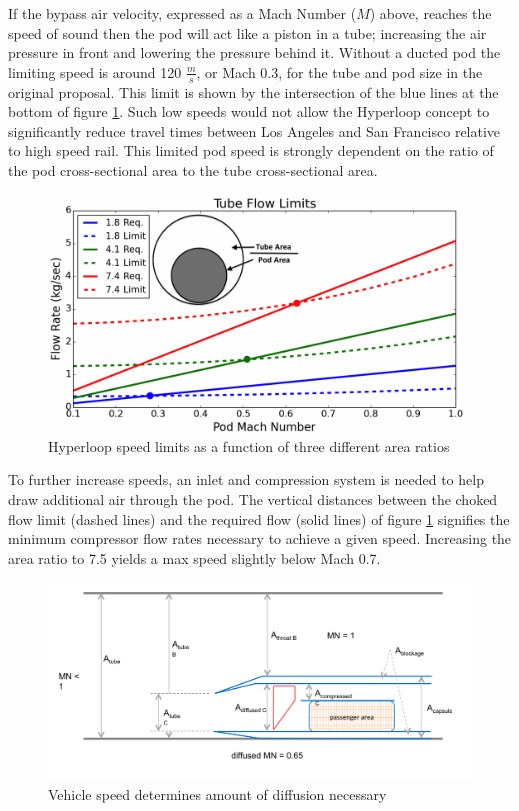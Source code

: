 \documentclass[heading.tex]{subfiles}
\begin{document}
If the bypass air velocity, expressed as a Mach Number ($M$) above, reaches the speed of sound then the pod will act like a piston in a tube;
increasing the air pressure in front and lowering the pressure behind it. Without a ducted pod the limiting speed is around
120 $\frac{m}{s}$, or Mach 0.3, for the tube and pod size in the original proposal. This limit is shown by the intersection of the blue lines at the
bottom of figure \ref{f:flowLIMIT}. Such low speeds would not allow the Hyperloop concept to significantly reduce travel times between Los Angeles
and San Francisco relative to high speed rail. This limited pod speed is strongly dependent on the ratio of the pod cross-sectional area to the tube
cross-sectional area.

\begin{figure}[hbtp]
\centering
\includegraphics[width=\textwidth]{images/tube_flow_limit3.png}
\caption{Hyperloop speed limits as a function of three different area ratios}
\label{f:flowLIMIT}
\end{figure}


To further increase speeds, an inlet and compression system is needed to help draw additional air through the pod. 
The vertical distances between the choked flow limit (dashed lines) and the required flow (solid lines) of figure \ref{f:flowLIMIT}
signifies the minimum compressor flow rates necessary to achieve a given speed.  Increasing the area ratio to 7.5 yields a max speed 
slightly below Mach 0.7.

\begin{figure}[hbtp]
\centering
\includegraphics[width=\textwidth]{images/diffused_inlet.png}
\caption[Inlet Diffuser]{Vehicle speed determines amount of diffusion necessary}
\label{f:diffuse}
\end{figure}
\end{document}
